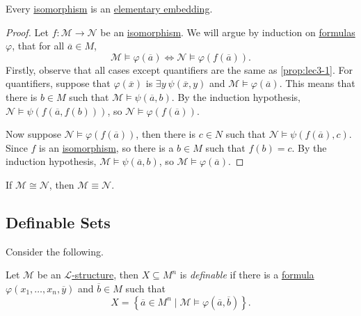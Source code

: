 \begin{proposition}\label{prop:isomorphism-is-elementary-embedding}
	Every \hyperref[def:isomorphism]{isomorphism} is an \hyperref[def:elementary-embedding]{elementary embedding}.
\end{proposition}
\begin{proof}
	Let \(f\colon \mathcal{M} \to  \mathcal{N} \) be an \hyperref[def:isomorphism]{isomorphism}. We will argue by induction on \hyperref[def:formula]{formulas} \(\varphi \), that for all \(\overline{a} \in M\),
	\[
		\mathcal{M} \models \varphi (\overline{a} ) \iff \mathcal{N} \models \varphi (f(\overline{a} )).
	\]
	Firstly, observe that all cases except quantifiers are the same as \autoref{prop:lec3-1}. For quantifiers, suppose that \(\varphi (\overline{x} )\) is \(\exists y\ \psi (\overline{x} , y)\) and \(\mathcal{M} \models \varphi (\overline{a} )\). This means that there is \(b\in M\) such that \(\mathcal{M} \models \psi (\overline{a} , b)\). By the induction hypothesis, \(\mathcal{N} \models \psi (f(\overline{a} , f(b)))\), so \(\mathcal{N} \models \varphi (f(\overline{a} ))\).

	Now suppose \(\mathcal{N} \models \varphi (f(\overline{a} ))\), then there is \(c\in N\) such that \(\mathcal{N} \models \psi (f(\overline{a} ), c)\). Since \(f\) is an \hyperref[def:isomorphism]{isomorphism}, so there is a \(b\in M\) such that \(f(b) = c\). By the induction hypothesis, \(\mathcal{M} \models \psi (\overline{a} , b)\), so \(\mathcal{M} \models \varphi (\overline{a} )\).
\end{proof}

\begin{corollary}
	If \(\mathcal{M} \cong \mathcal{N} \), then \(\mathcal{M} \equiv \mathcal{N} \).
\end{corollary}

\subsection{Definable Sets}
Consider the following.

\begin{definition}[Definable]\label{def:definable}
	Let \(\mathcal{M} \) be an \hyperref[def:structure]{\(\mathcal{L} \)-structure}, then \(X \subseteq M^n\) is \emph{definable} if there is a \hyperref[def:formula]{formula} \(\varphi (x_1, \ldots , x_n, \overline{y} )\) and \(\overline{b} \in M\) such that
	\[
		X = \left\{ \overline{a} \in M^n \mid \mathcal{M} \models \varphi (\overline{a} , \overline{b} ) \right\}.
	\]
\end{definition}

